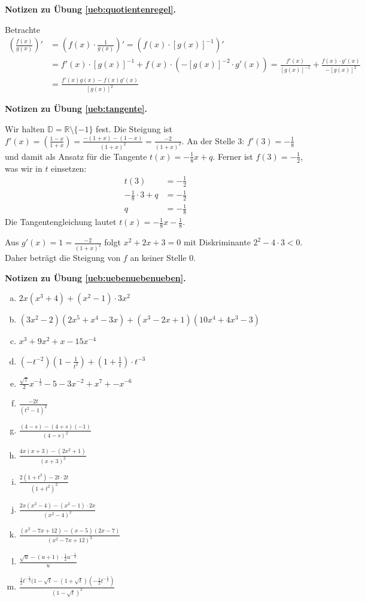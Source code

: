 \documentclass[%
11pt,%
twoside,%
titlepage,%
german,%
headsepline%
]{scrartcl}
\theoremstyle{definition}
\theoremstyle{plain}
\newcommand{\concatueb}[1]{ueb:#1}%
\newcommand{\concatlsg}[1]{lsg:#1}%
\newenvironment{lsg}[1]{%
    \par\noindent\textbf{Notizen zu Übung \ref{\concatueb{#1}}.}%
    \label{\concatlsg{#1}}
}{%
    \par%
}
\begin{document}
\begin{lsg}{quotientenregel}
    Betrachte
    \begin{align*}
        \left(\frac{f(x)}{g(x)}\right)' &= \left(f(x)\cdot\frac{1}{g(x)}\right)' = \left(f(x)\cdot[{g(x)}]^{-1}\right)'\\
        &= f'(x)\cdot[{g(x)}]^{-1}+f(x)\cdot(-[{g(x)}]^{-2}\cdot g'(x))
        = \frac{f'(x)}{[{g(x)}]^{-1}}+\frac{f(x)\cdot g'(x)}{-[{g(x)}]^{2}}\\
        &= \frac{f'(x)g(x)-f(x)g'(x)}{[{g(x)}]^{2}}
    \end{align*}
\end{lsg}
\begin{lsg}{tangente}
    Wir halten $\mathbb{D}=\mathbb{R}\setminus\{-1\}$ fest. Die Steigung ist $f'(x)=\left(\frac{1-x}{1+x}\right)=\frac{-(1+x)-(1-x)}{(1+x)^2}=\frac{-2}{(1+x)^2}$. An der Stelle $3$: $f'(3)=-\frac{1}{8}$ und damit als Ansatz für die Tangente $t(x)=-\frac{1}{8}x+q$. Ferner ist $f(3)=-\frac{1}{2}$, was wir in $t$ einsetzen:
    \begin{align*}
        t(3) &= -\frac{1}{2}\\
        -\frac{1}{8}\cdot3+q &= -\frac{1}{2}\\
        q &= -\frac{1}{8}
    \end{align*}
    Die Tangentengleichung lautet $t(x)=-\frac{1}{8}x-\frac{1}{8}$.
    
    Aus $g'(x)=1=\frac{-2}{(1+x)^2}$ folgt $x^2+2x+3=0$ mit Diskriminante $2^2-4\cdot3<0$. Daher beträgt die Steigung von $f$ an keiner Stelle $0$.
\end{lsg}
\begin{lsg}{uebenuebenueben}
    \begin{enumerate}[a)]
        \item $2x(x^3+4)+(x^2-1)\cdot3x^2$
        \item $(3x^2-2)(2x^5+x^4-3x)+(x^3-2x+1)(10x^4+4x^3-3)$
        \item $x^3+9x^2+x-15x^{-4}$
        \item $(-t^{-2})(1-\frac{1}{t^2})+(1+\frac{1}{t})\cdot t^{-3}$
        \item $\frac{\sqrt{7}}{2}x^{-\frac{1}{2}}-5-3x^{-2}+x^7+-x^{-6}$
        \item $\frac{-2t}{(t^2-1)^2}$
        \item $\frac{(4-s)-(4+s)(-1)}{(4-s)^2}$
        \item $\frac{4x(x+3)-(2x^2+1)}{(x+3)^2}$
        \item $\frac{2(1+t^2)-2t\cdot2t}{(1+t^2)^2}$
        \item $\frac{2x(x^2-4)-(x^2-1)\cdot 2x}{(x^2-4)^2}$
        \item $\frac{(x^2-7x+12)-(x-5)(2x-7)}{(x^2-7x+12)^2}$
        \item $\frac{\sqrt{u}-(u+1)\cdot\frac{1}{2}u^{-\frac{1}{2}}}{u}$
        \item $\frac{\frac{1}{2}t^{-\frac{1}{2}}(1-\sqrt{t}-(1+\sqrt{t})(-\frac{1}{2}t^{-\frac{1}{2}})}{(1-\sqrt{t})^2}$
    \end{enumerate}
\end{lsg}
\end{document}
